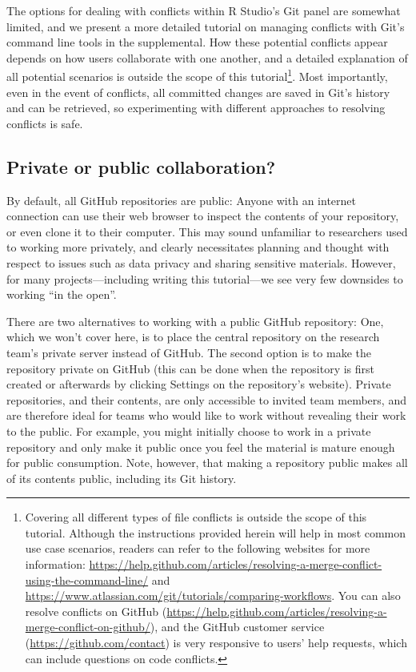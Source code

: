 \documentclass[
  american,
  ,doc,floatsintext]{apa6}
\begin{document}
The options for dealing with conflicts within R Studio's Git panel are somewhat limited, and we present a more detailed tutorial on managing conflicts with Git's command line tools in the supplemental. How these potential conflicts appear depends on how users collaborate with one another, and a detailed explanation of all potential scenarios is outside the scope of this tutorial\footnote{Covering all different types of file conflicts is outside the scope of this tutorial. Although the instructions provided herein will help in most common use case scenarios, readers can refer to the following websites for more information: \url{https://help.github.com/articles/resolving-a-merge-conflict-using-the-command-line/} and \url{https://www.atlassian.com/git/tutorials/comparing-workflows}. You can also resolve conflicts on GitHub (\url{https://help.github.com/articles/resolving-a-merge-conflict-on-github/}), and the GitHub customer service (\url{https://github.com/contact}) is very responsive to users' help requests, which can include questions on code conflicts.}. Most importantly, even in the event of conflicts, all committed changes are saved in Git's history and can be retrieved, so experimenting with different approaches to resolving conflicts is safe.

\hypertarget{private-or-public-collaboration}{%
\subsection{Private or public collaboration?}\label{private-or-public-collaboration}}

By default, all GitHub repositories are public: Anyone with an internet connection can use their web browser to inspect the contents of your repository, or even clone it to their computer. This may sound unfamiliar to researchers used to working more privately, and clearly necessitates planning and thought with respect to issues such as data privacy and sharing sensitive materials. However, for many projects---including writing this tutorial---we see very few downsides to working \enquote{in the open}.

There are two alternatives to working with a public GitHub repository: One, which we won't cover here, is to place the central repository on the research team's private server instead of GitHub. The second option is to make the repository private on GitHub (this can be done when the repository is first created or afterwards by clicking Settings on the repository's website). Private repositories, and their contents, are only accessible to invited team members, and are therefore ideal for teams who would like to work without revealing their work to the public. For example, you might initially choose to work in a private repository and only make it public once you feel the material is mature enough for public consumption. Note, however, that making a repository public makes all of its contents public, including its Git history.
\end{document}
